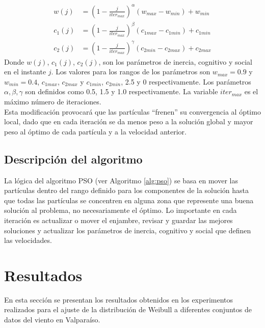 \begin{align}\label{eq:VariationParameters}
    w(j) &= (1 - \frac{j}{iter_{max}})^{\alpha}(w_{max} - w_{min}) + w_{min}\\
    c_{1}(j) &= (1 - \frac{j}{iter_{max}})^{\beta}(c_{1max} - c_{1min}) + c_{1min}\\
    c_{2}(j) &= (1 - \frac{j}{iter_{max}})^{\gamma}(c_{2min} - c_{2max}) + c_{2max}
\end{align}    
Donde $w(j)$, $c_{1}(j)$, $c_{2}(j)$, son los parámetros de inercia, cognitivo y social en el instante $j$. Los valores para los rangos de los parámetros son $w_{max} = 0.9$ y $w_{min} = 0.4$, $c_{1max}$, $c_{2max}$ y $c_{1min}$, $c_{2min}$, 2.5 y 0 respectivamente. Los parámetros $\alpha, \beta, \gamma$ son definidos como 0.5, 1.5 y 1.0 respectivamente. La variable $iter_{max}$ es el máximo número de iteraciones. \\
Esta modificación provocará que las partículas ``frenen'' su convergencia al óptimo local, dado que en cada iteración se da menos peso a la solución global y mayor peso al óptimo de cada partícula y a la velocidad anterior.

\subsection{Descripción del algoritmo}
La lógica del algoritmo PSO (ver Algoritmo \ref{alg:pso}) se basa en mover las partículas dentro del rango definido para los componentes de la solución hasta que todas las partículas se concentren en alguna zona que represente una buena solución al problema, no necesariamente el óptimo. Lo importante en cada iteración es actualizar o mover el enjambre, revisar y guardar las mejores soluciones y actualizar los parámetros de inercia, cognitivo y social que definen las velocidades.



\section{Resultados}\label{sec:Experimentos_velocidad}
En esta sección se presentan los resultados obtenidos en los experimentos realizados para el ajuste de la distribución de Weibull a diferentes conjuntos de datos del viento en Valparaíso.
